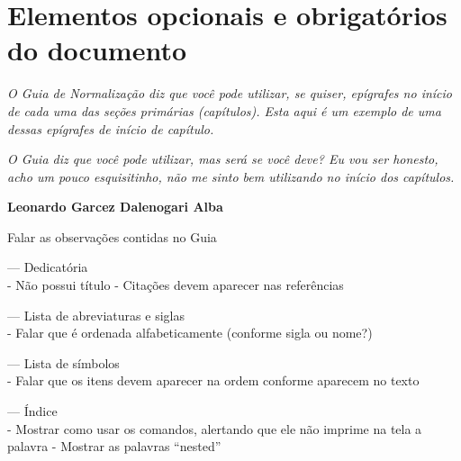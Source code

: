 \chapter{Elementos opcionais e obrigatórios do documento}
\hspace{\fill}
\begin{minipage}{6cm}
    \begin{singlespace} %
        \textit{O Guia de Normalização diz que você pode utilizar, se quiser, epígrafes no início de cada uma das seções primárias (capítulos). Esta aqui é um exemplo de uma dessas epígrafes de início de capítulo.} 
        
        \textit{O Guia diz que você pode utilizar, mas será se você deve? Eu vou ser honesto, acho um pouco esquisitinho, não me sinto bem utilizando no início dos capítulos.}
        
        \textbf{Leonardo Garcez Dalenogari Alba}
    \end{singlespace}
\end{minipage}

Falar as observações contidas no Guia

--- Dedicatória\\
    - Não possui título
    - Citações devem aparecer nas referências

--- Lista de abreviaturas e siglas\\
    - Falar que é ordenada alfabeticamente (conforme sigla ou nome?)

--- Lista de símbolos\\
    - Falar que os itens devem aparecer na ordem conforme aparecem no texto

--- Índice\\
    - Mostrar como usar os comandos, alertando que ele não imprime na tela a palavra
    - Mostrar as palavras ``nested''
